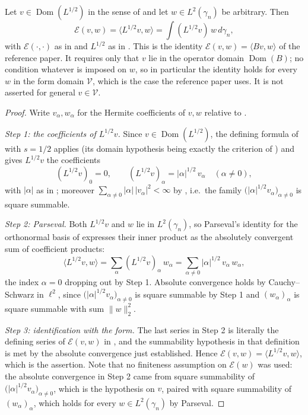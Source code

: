 \begin{lemma}[The energy form represents the operator $B = L^{1/2}$ on its domain]
Let $v \in \operatorname{Dom}(L^{1/2})$ in the sense of 
and let $w \in L^2(\gamma_n)$ be arbitrary.  Then
\[
  \mathcal{E}(v, w) = \langle L^{1/2}v, w\rangle = \int (L^{1/2}v)\, w \, d\gamma_n ,
\]
with $\mathcal{E}(\cdot,\cdot)$ as in  and $L^{1/2}$ as in
.  This is the identity $\mathcal{E}(v,w) = \langle Bv, w\rangle$
of the reference paper.  It requires only that $v$ lie in the operator domain
$\operatorname{Dom}(B)$; no condition whatever is imposed on $w$, so in
particular the identity holds for every $w$ in the form domain $\mathcal{V}$,
which is the case the reference paper uses.  It is not asserted for general
$v \in \mathcal{V}$.
\end{lemma}
\begin{proof}
Write $v_\alpha, w_\alpha$ for the Hermite coefficients of $v, w$ relative to
.

\emph{Step 1: the coefficients of $L^{1/2}v$.}
Since $v \in \operatorname{Dom}(L^{1/2})$, the defining formula of
 with $s = 1/2$ applies (its domain hypothesis being exactly the
criterion of ) and gives $L^{1/2}v$ the coefficients
\[
  (L^{1/2}v)_0 = 0,
  \qquad
  (L^{1/2}v)_\alpha = |\alpha|^{1/2}\, v_\alpha \quad (\alpha \neq 0),
\]
with $|\alpha|$ as in ; moreover
$\sum_{\alpha\neq0}|\alpha|\,|v_\alpha|^2 < \infty$ by
, i.e.\ the family
$\bigl(|\alpha|^{1/2}v_\alpha\bigr)_{\alpha\neq0}$ is square summable.

\emph{Step 2: Parseval.}
Both $L^{1/2}v$ and $w$ lie in $L^2(\gamma_n)$, so Parseval's identity for the
orthonormal basis of  expresses their inner product as the
absolutely convergent sum of coefficient products:
\[
  \langle L^{1/2}v, w\rangle
    = \sum_{\alpha} (L^{1/2}v)_\alpha\, w_\alpha
    = \sum_{\alpha \neq 0} |\alpha|^{1/2}\, v_\alpha\, w_\alpha ,
\]
the index $\alpha = 0$ dropping out by Step 1.  Absolute convergence holds by
Cauchy--Schwarz in $\ell^2$, since $\bigl(|\alpha|^{1/2}v_\alpha\bigr)_{\alpha\neq0}$
is square summable by Step 1 and $(w_\alpha)_\alpha$ is square summable with sum
$\|w\|_2^2$.

\emph{Step 3: identification with the form.}
The last series in Step 2 is literally the defining series of
$\mathcal{E}(v,w)$ in , and the summability hypothesis in that
definition is met by the absolute convergence just established.  Hence
$\mathcal{E}(v,w) = \langle L^{1/2}v,w\rangle$, which is the assertion.  Note
that no finiteness assumption on $\mathcal{E}(w)$ was used: the absolute
convergence in Step 2 came from square summability of
$\bigl(|\alpha|^{1/2}v_\alpha\bigr)_{\alpha\neq0}$, which is the hypothesis on
$v$, paired with square summability of $(w_\alpha)_\alpha$, which holds for
every $w \in L^2(\gamma_n)$ by Parseval.
\end{proof}
